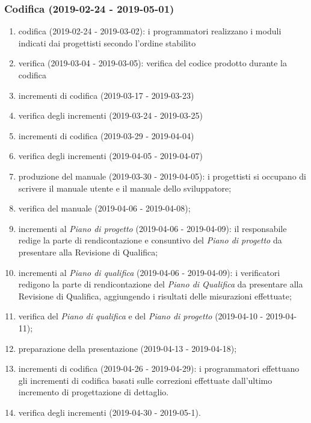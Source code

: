 		\subsubsection{Codifica (2019-02-24 - 2019-05-01)}
			\begin{enumerate}[label= 4.2.\arabic*)]
				\item codifica (2019-02-24 - 2019-03-02): i programmatori realizzano i moduli indicati dai progettisti secondo l'ordine stabilito
				\item verifica (2019-03-04 - 2019-03-05): verifica del codice prodotto durante la codifica
				\item incrementi di codifica (2019-03-17 - 2019-03-23)
				\item verifica degli incrementi (2019-03-24 - 2019-03-25)
				\item incrementi di codifica (2019-03-29 - 2019-04-04)
				\item verifica degli incrementi (2019-04-05 - 2019-04-07)
				\item produzione del manuale (2019-03-30 - 2019-04-05): i progettisti si occupano di scrivere il manuale utente e il manuale dello sviluppatore;
				\item verifica del manuale (2019-04-06 - 2019-04-08);
				\item incrementi al \textit{Piano di progetto} (2019-04-06 - 2019-04-09): il responsabile redige la parte di rendicontazione e consuntivo del \textit{Piano di progetto} da presentare alla Revisione di Qualifica;
				\item incrementi al \textit{Piano di qualifica} (2019-04-06 - 2019-04-09): i verificatori redigono la parte di rendicontazione del \textit{Piano di Qualifica} da presentare alla Revisione di Qualifica, aggiungendo i risultati delle misurazioni effettuate;
				\item verifica del \textit{Piano di qualifica} e del \textit{Piano di progetto} (2019-04-10 - 2019-04-11);
				\item preparazione della presentazione (2019-04-13 - 2019-04-18);
				\item incrementi di codifica (2019-04-26 - 2019-04-29): i programmatori effettuano gli incrementi di codifica basati sulle correzioni effettuate dall'ultimo incremento di progettazione di dettaglio.
				\item verifica degli incrementi (2019-04-30 - 2019-05-1).
			\end{enumerate}
			
